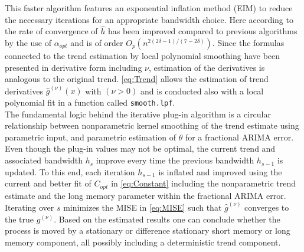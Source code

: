 \documentclass[12pt]{article}
\newcommand{\code}[1]{\texttt{#1}}
\begin{document}
This faster algorithm features an exponential inflation method (EIM) to reduce the necessary iterations for an appropriate bandwidth choice. 
Here according to \textcite{beran2002iterative} the rate of convergence of \( \hat{h} \) has been improved compared to previous algorithms by the use of \( \alpha_{opt} \) and is of order \(O_p(n^{2(2\delta-1)/(7-2\delta)}) \).
Since the formulas connected to the trend estimation by local polynomial smoothing have been presented in derivative form including \( \nu \), estimation of the derivatives is analogous to the original trend.  
\eqref{eq:Trend} allows the estimation of trend derivatives \( \hat{g}^{(\nu)}(x) \) with \((\nu > 0)\)
and is conducted also with a local polynomial fit in a function called \code{smooth.lpf}.\\
%
The fundamental logic behind the iterative plug-in algorithm is a circular relationship between nonparametric kernel smoothing of the trend estimate using parametric input, 
and parametric estimation of \( \theta \) for a fractional ARIMA error. 
Even though the plug-in values may not be optimal, the current trend and associated bandwidth \( h_s \) improve every time the previous bandwidth \(h_{s-1}\) is updated. To this end, each iteration \(h_{s-1}\) is inflated and improved using the current and better fit of \(C_{opt}\) in \eqref{eq:Constant} including the nonparametric trend estimate and the long memory parameter within the fractional ARIMA error.
Iterating over \(s\) minimizes the MISE in \eqref{eq:MISE} such that \(\hat{g}^{(\nu)}\) converges to the true \(g^{(\nu)}\). Based on the estimated results one can conclude whether the process is moved by a stationary or difference stationary short memory or long memory component, all possibly including a deterministic trend component.
\end{document}
